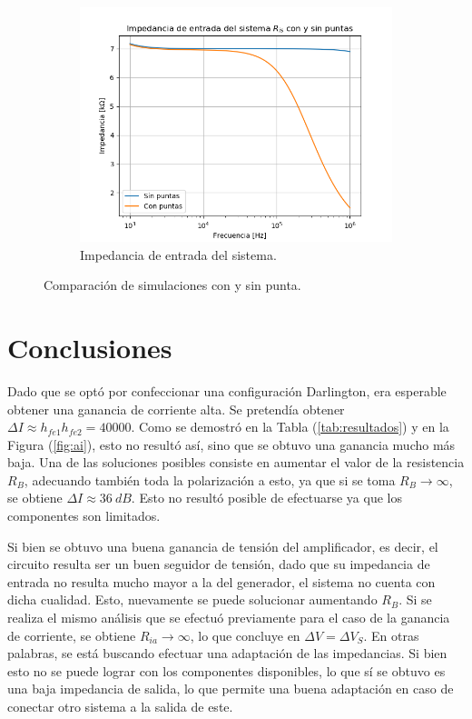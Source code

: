 \begin{figure}[H]
\begin{subfigure}{.5\textwidth}
	\includegraphics[width=1\textwidth]{Imagenes/Ris_cp.png}
	\caption{Impedancia de entrada del sistema.}
	\label{fig:ris-cp}
\end{subfigure}
\caption{Comparación de simulaciones con y sin punta.}
\label{fig:cpvssp}
\end{figure}

\section{Conclusiones} \label{sec:conclusiones}
Dado que se optó por confeccionar una configuración Darlington, era esperable obtener una ganancia de corriente alta. Se pretendía obtener $\Delta I \approx h_{fe1} h_{fe2} = 40000$. Como se demostró en la Tabla (\ref{tab:resultados}) y en la Figura (\ref{fig:ai}), esto no resultó así, sino que se obtuvo una ganancia mucho más baja. Una de las soluciones posibles consiste en aumentar el valor de la resistencia $R_B$, adecuando también toda la polarización a esto, ya que si se toma $R_B \rightarrow \infty$, se obtiene $\Delta I \approx 36 \ dB$. Esto no resultó posible de efectuarse ya que los componentes son limitados.

Si bien se obtuvo una buena ganancia de tensión del amplificador, es decir, el circuito resulta ser un buen seguidor de tensión, dado que su impedancia de entrada no resulta mucho mayor a la del generador, el sistema no cuenta con dicha cualidad. Esto, nuevamente se puede solucionar aumentando $R_B$. Si se realiza el mismo análisis que se efectuó previamente para el caso de la ganancia de corriente, se obtiene $R_{ia} \rightarrow \infty$, lo que concluye en $\Delta V = \Delta V_S$. En otras palabras, se está buscando efectuar una adaptación de las impedancias. Si bien esto no se puede lograr con los componentes disponibles, lo que sí se obtuvo es una baja impedancia de salida, lo que permite una buena adaptación en caso de conectar otro sistema a la salida de este. 

